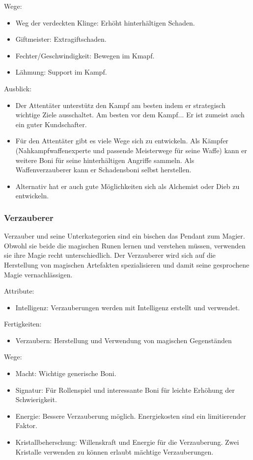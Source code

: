 \documentclass{article}
\begin{document}
Wege:
\begin{itemize}
\item Weg der verdeckten Klinge: Erhöht hinterhältigen Schaden.
\item Giftmeister: Extragiftschaden.
\item Fechter/Geschwindigkeit: Bewegen im Kmapf.
\item Lähmung: Support im Kampf.
\end{itemize}

Ausblick:
\begin{itemize}
\item Der Attentäter unterstütz den Kampf am besten indem er strategisch wichtige Ziele ausschaltet. Am besten vor dem Kampf... Er ist zumeist auch ein guter Kundschafter.
\item Für den Attentäter gibt es viele Wege sich zu entwickeln. Als Kämpfer (Nahkampfwaffenexperte und passende Meisterwege für seine Waffe) kann er weitere Boni für seine hinterhältigen Angriffe sammeln. Als Waffenverzauberer kann er Schadensboni selbst herstellen.
\item Alternativ hat er auch gute Möglichkeiten sich als Alchemist oder Dieb zu entwickeln.
\end{itemize}

\subsubsection{Verzauberer}
Verzauber und seine Unterkategorien sind ein bischen das Pendant zum Magier. Obwohl sie beide die magischen Runen
lernen und verstehen müssen, verwenden sie ihre Magie recht unterschiedlich. Der Verzauberer wird sich auf die
Herstellung von magischen Artefakten spezialisieren und damit seine gesprochene Magie vernachlässigen.

Attribute:
\begin{itemize}
\item Intelligenz: Verzauberungen werden mit Intelligenz erstellt und verwendet.
\end{itemize}

Fertigkeiten:
\begin{itemize}
\item Verzaubern: Herstellung und Verwendung von magischen Gegenständen
\end{itemize}

Wege:
\begin{itemize}
\item Macht: Wichtige generische Boni.
\item Signatur: Für Rollenspiel und interessante Boni für leichte Erhöhung der Schwierigkeit.
\item Energie: Bessere Verzauberung möglich. Energiekosten sind ein limitierender Faktor.
\item Kristallbeherschung: Willenskraft und Energie für die Verzauberung. Zwei Kristalle verwenden zu können erlaubt mächtige Verzauberungen.
\end{itemize}
\end{document}
